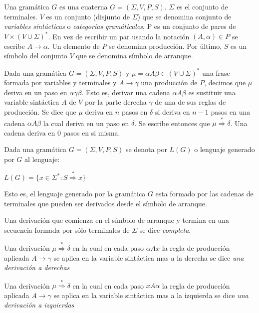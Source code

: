 \begin{definition}
Una gramática $G$ es una cuaterna $G =(\Sigma,V,P,S)$. 
$\Sigma$ es el conjunto de terminales. $V$ es un conjunto (disjunto de $\Sigma$)
que se denomina conjunto de \emph{variables sintácticas} o \emph{categorías gramáticales},
P es un conjunto de pares de $V \times (V \cup \Sigma )^*$. En vez de escribir
un par usando la notación $(A, \alpha) \in P$ se escribe $A \rightarrow \alpha$.
Un elemento de $P$ se denomina producción. Por último, $S$ es un símbolo del conjunto
$V$ que se denomina símbolo de arranque.
\end{definition}

\begin{definition}
Dada una gramática $G=(\Sigma,V,P,S)$ y $\mu = \alpha A \beta \in (V \cup \Sigma)^*$
una frase formada por variables y terminales y $A \rightarrow \gamma$ una producción de 
$P$, decimos que  $\mu$ deriva en un paso en  $\alpha \gamma \beta$. Esto es, derivar 
una cadena $\alpha A \beta$ es sustituir 
una variable sintáctica $A$ de $V$ por la parte derecha $\gamma$ de una de sus reglas de producción.
Se dice que $\mu$ deriva en $n$ pasos en $\delta$ si deriva en $n-1$ pasos en una cadena
$\alpha A \beta$ la cual deriva en un paso en $\delta$. Se escribe entonces
que $\mu  \stackrel{*}{\Longrightarrow}  \delta$. Una cadena deriva en 0 pasos en si misma.

\end{definition}

\begin{definition}
\label{definition:lenguajegenerado}
Dada una gramática $G=(\Sigma,V,P,S)$ se denota por $L(G)$ o lenguaje
generado por $G$ al lenguaje:

\begin{center}
$L(G) = \{ x \in \Sigma^* : S \stackrel{*}{\Longrightarrow} x \}$
\end{center}

Esto es, el lenguaje generado por la gramática $G$ esta formado por las cadenas
de terminales que pueden ser derivados desde el símbolo de arranque.
\end{definition}

\begin{definition}
Una derivación que comienza en el símbolo de arranque y termina en una secuencia
formada por sólo terminales de $\Sigma$ se dice \emph{completa}.

Una derivación $\mu  \stackrel{*}{\Longrightarrow}  \delta$ 
en la cual en cada paso $\alpha A x$ la regla de producción aplicada $A \rightarrow \gamma$
se aplica en la variable sintáctica mas a la derecha se dice \emph{una derivación a derechas}

Una derivación $\mu  \stackrel{*}{\Longrightarrow}  \delta$ 
en la cual en cada paso $x A \alpha$ la regla de producción aplicada $A \rightarrow \gamma$
se aplica en la variable sintáctica mas a la izquierda se dice \emph{una derivación a izquierdas}
\end{definition}

